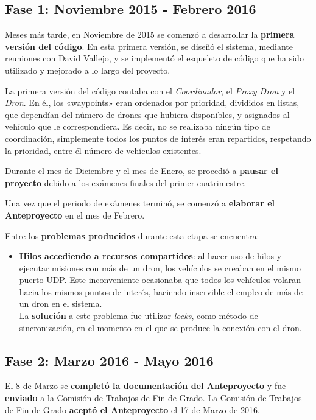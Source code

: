 \subsection{Fase 1: Noviembre 2015 - Febrero 2016}
\label{sec:segundaetapa}

Meses más tarde, en Noviembre de 2015 se comenzó a desarrollar la \textbf{primera versión del código}. En esta primera versión, se diseñó el sistema, mediante reuniones con David Vallejo, y se implementó el esqueleto de código que ha sido utilizado y mejorado a lo largo del proyecto. 

La primera versión del código contaba con el \textit{Coordinador}, el \textit{Proxy Dron} y el \textit{Dron}. En él, los «waypoints» eran ordenados por prioridad, divididos en listas, que dependían del número de drones que hubiera disponibles, y asignados al vehículo que le correspondiera. Es decir, no se realizaba ningún tipo de coordinación, simplemente todos los puntos de interés eran repartidos, respetando la prioridad, entre él número de vehículos existentes.

Durante el mes de Diciembre y el mes de Enero, se procedió a \textbf{pausar el proyecto} debido a los exámenes finales del primer cuatrimestre. 

Una vez que el periodo de exámenes terminó, se comenzó a \textbf{elaborar el Anteproyecto} en el mes de Febrero.

Entre los \textbf{problemas producidos} durante esta etapa se encuentra:
\begin{itemize}
\item \textbf{Hilos accediendo a recursos compartidos}: al hacer uso de hilos y ejecutar misiones con más de un dron, los vehículos se creaban en el mismo puerto UDP. Este inconveniente ocasionaba que todos los vehículos volaran hacia los mismos puntos de interés, haciendo inservible el empleo de más de un dron en el sistema. \\ La \textbf{solución} a este problema fue utilizar \textit{locks}, como método de sincronización, en el momento en el que se produce la conexión con el dron.
\end{itemize}

\subsection{Fase 2: Marzo 2016 - Mayo 2016}
\label{sec:terceraetapa}

El 8 de Marzo se \textbf{completó la documentación del Anteproyecto} y fue \textbf{enviado} a la Comisión de Trabajos de Fin de Grado. La Comisión de Trabajos de Fin de Grado \textbf{aceptó el Anteproyecto} el 17 de Marzo de 2016.

